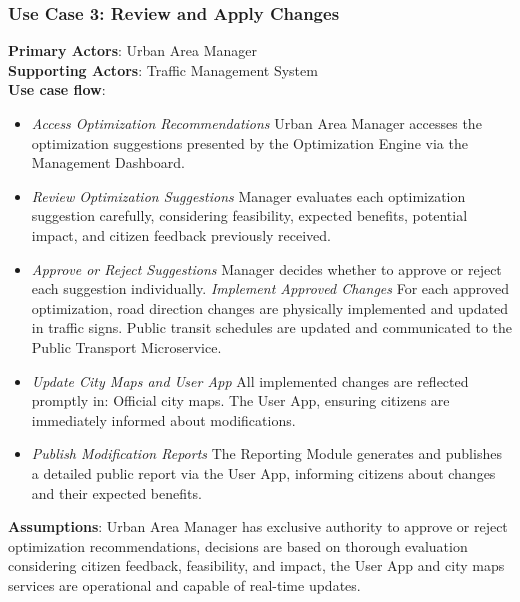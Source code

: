 \documentclass[a4paper,12pt]{article}
\begin{document}
\subsubsection*{Use Case 3: Review and Apply Changes}
\textbf{Primary Actors}: Urban Area Manager \\
\textbf{Supporting Actors}: Traffic Management System \\ 
\textbf{Use case flow}: 
\begin{itemize}
\item \textit{Access Optimization Recommendations} Urban Area Manager accesses the optimization suggestions presented by the Optimization Engine via the Management Dashboard.
\item \textit{Review Optimization Suggestions} Manager evaluates each optimization suggestion carefully, considering feasibility, expected benefits, potential impact, and citizen feedback previously received.
\item \textit{Approve or Reject Suggestions} Manager decides whether to approve or reject each suggestion individually.
\Item \textit{Implement Approved Changes} For each approved optimization, road direction changes are physically implemented and updated in traffic signs.
Public transit schedules are updated and communicated to the Public Transport Microservice.
\item \textit{Update City Maps and User App} All implemented changes are reflected promptly in: Official city maps.
The User App, ensuring citizens are immediately informed about modifications.
\item \textit{Publish Modification Reports} The Reporting Module generates and publishes a detailed public report via the User App, informing citizens about changes and their expected benefits.
\end{itemize}
\textbf{Assumptions}: Urban Area Manager has exclusive authority to approve or reject optimization recommendations, decisions are based on thorough evaluation considering citizen feedback, feasibility, and impact, the User App and city maps services are operational and capable of real-time updates.
\end{document}
